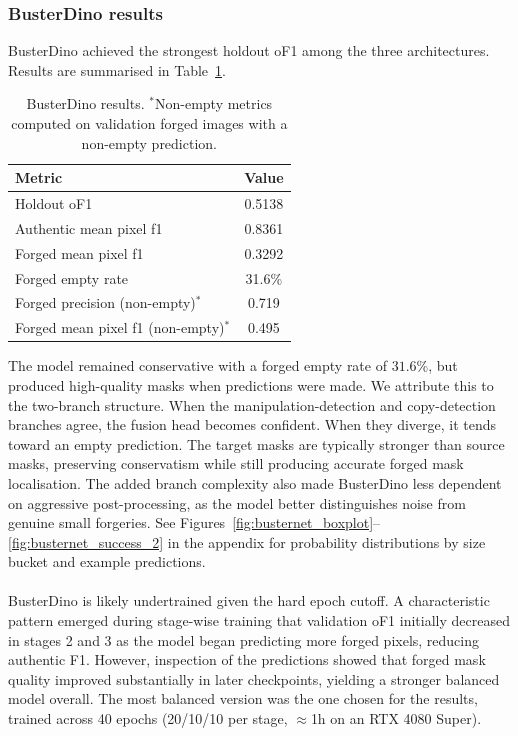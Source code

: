\documentclass[final]{nldl}
\begin{document}
\subsubsection{BusterDino results}
BusterDino achieved the strongest holdout oF1 among the three architectures. Results are summarised in Table~\ref{tab:busternet_results}.
\begin{table}[H]
	\centering
	\small
	\begin{tabular}{lc}
		\toprule
		Metric & Value \\
		\midrule
		Holdout oF1 & 0.5138 \\
		Authentic mean pixel f1 & 0.8361 \\
		Forged mean pixel f1 & 0.3292 \\
		Forged empty rate & 31.6\% \\
		Forged precision (non-empty)$^*$ & 0.719 \\
		Forged mean pixel f1 (non-empty)$^*$ & 0.495 \\
		\bottomrule
	\end{tabular}
	\caption{BusterDino results. $^*$Non-empty metrics computed on validation forged images with a non-empty prediction.}
	\label{tab:busternet_results}
\end{table}
The model remained conservative with a forged empty rate of $31.6\%$, but produced high-quality masks when predictions were made. We attribute this to the two-branch structure. When the manipulation-detection and copy-detection branches agree, the fusion head becomes confident. When they diverge, it tends toward an empty prediction. The target masks are typically stronger than source masks, preserving conservatism while still producing accurate forged mask localisation. The added branch complexity also made BusterDino less dependent on aggressive post-processing, as the model better distinguishes noise from genuine small forgeries. See Figures~\ref{fig:busternet_boxplot}--\ref{fig:busternet_success_2} in the appendix for probability distributions by size bucket and example predictions.
\\\\
BusterDino is likely undertrained given the hard epoch cutoff. A characteristic pattern emerged during stage-wise training that validation oF1 initially decreased in stages 2 and 3 as the model began predicting more forged pixels, reducing authentic F1. However, inspection of the predictions showed that forged mask quality improved substantially in later checkpoints, yielding a stronger balanced model overall. The most balanced version was the one chosen for the results, trained across 40 epochs (20/10/10 per stage, $\approx$1h on an RTX 4080 Super).
\end{document}
